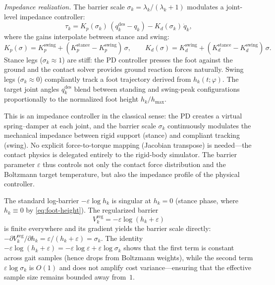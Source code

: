 \medskip\noindent\emph{Impedance realization.}
The barrier scale $\sigma_k = \lambda_k / (\lambda_k + 1)$ modulates a
joint-level impedance controller:
\begin{equation}\label{eq:impedance}
\tau_k = K_p(\sigma_k)\,(q_k^{\mathrm{des}} - q_k)
       - K_d(\sigma_k)\,\dot{q}_k,
\end{equation}
where the gains interpolate between stance and swing:
\[
K_p(\sigma) = K_p^{\mathrm{swing}}
  + (K_p^{\mathrm{stance}} - K_p^{\mathrm{swing}})\,\sigma, \qquad
K_d(\sigma) = K_d^{\mathrm{swing}}
  + (K_d^{\mathrm{stance}} - K_d^{\mathrm{swing}})\,\sigma.
\]
Stance legs ($\sigma_k \approx 1$) are stiff: the PD controller presses the
foot against the ground and the contact solver provides ground reaction forces
naturally.
Swing legs ($\sigma_k \approx 0$) compliantly track a foot trajectory derived
from $h_k(t;\varphi)$.
The target joint angles $q_k^{\mathrm{des}}$ blend between standing and
swing-peak configurations proportionally to the normalized foot height
$h_k / h_{\max}$.

This is an impedance controller in the classical sense: the PD creates a
virtual spring--damper at each joint, and the barrier scale $\sigma_k$
continuously modulates the mechanical impedance between rigid support
(stance) and compliant tracking (swing).
No explicit force-to-torque mapping (Jacobian transpose) is needed---the
contact physics is delegated entirely to the rigid-body simulator.
The barrier parameter $\varepsilon$ thus controls not only the contact force
distribution and the Boltzmann target temperature, but also the impedance profile of
the physical controller.

\begin{remark}
\label{rem:regularized-barrier}
The standard log-barrier $-\varepsilon\log h_k$ is singular at $h_k = 0$
(stance phase, where $h_k \equiv 0$ by \eqref{eq:foot-height}).
The regularized barrier
\[
V_k^{\mathrm{reg}} = -\varepsilon\log(h_k + \varepsilon)
\]
is finite everywhere and its gradient yields the barrier scale directly:
$-\partial V_k^{\mathrm{reg}}/\partial h_k = \varepsilon/(h_k + \varepsilon) = \sigma_k$.
The identity
$-\varepsilon\log(h_k + \varepsilon) = -\varepsilon\log\varepsilon + \varepsilon\log\sigma_k$
shows that the first term is constant across gait samples (hence drops from
Boltzmann weights), while the second term $\varepsilon\log\sigma_k$ is $O(1)$
and does not amplify cost variance---ensuring that the effective sample size
remains bounded away from~$1$.
\end{remark}

